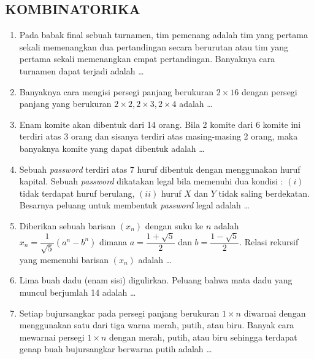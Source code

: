 \documentclass[12pt,twoside]{article}
\begin{document}
\subsection{KOMBINATORIKA}
\begin{enumerate}
	\item Pada babak final sebuah turnamen, tim pemenang adalah tim yang pertama sekali memenangkan dua pertandingan secara berurutan atau tim yang pertama sekali memenangkan empat pertandingan. Banyaknya cara turnamen dapat terjadi adalah \dots

	\item Banyaknya cara mengisi persegi panjang berukuran $2\times16$ dengan persegi panjang yang berukuran $2\times2, 2\times3, 2\times4$ adalah \dots

	\item Enam komite akan dibentuk dari 14 orang. Bila 2 komite dari 6 komite ini terdiri atas 3 orang dan sisanya terdiri atas masing-masing 2 orang, maka banyaknya komite yang dapat dibentuk adalah \dots

	\item Sebuah \textit{password} terdiri atas 7 huruf dibentuk dengan menggunakan huruf kapital. Sebuah \textit{password} dikatakan legal bila memenuhi dua kondisi : $(i)$ tidak terdapat huruf berulang, $(ii)$ huruf $X$ dan $Y$ tidak saling berdekatan. Besarnya peluang untuk membentuk \textit{password} legal adalah \dots

	\item Diberikan sebuah barisan $(x_n)$ dengan suku ke $n$ adalah $x_n = \dfrac{1}{\sqrt{5}}(a^n-b^n)$ dimana $a = \dfrac{1+\sqrt{5}}{2}$ dan $b = \dfrac{1-\sqrt{5}}{2}$. Relasi rekursif yang memenuhi barisan $(x_n)$ adalah \dots

	\item Lima buah dadu (enam sisi) digulirkan. Peluang bahwa mata dadu yang muncul berjumlah 14 adalah \dots

	\item Setiap bujursangkar pada persegi panjang berukuran $1 \times n$ diwarnai dengan menggunakan satu dari tiga warna merah, putih, atau biru. Banyak cara mewarnai persegi $1 \times n$ dengan merah, putih, atau biru sehingga terdapat genap buah bujursangkar berwarna putih adalah \dots


\end{enumerate}
\end{document}
